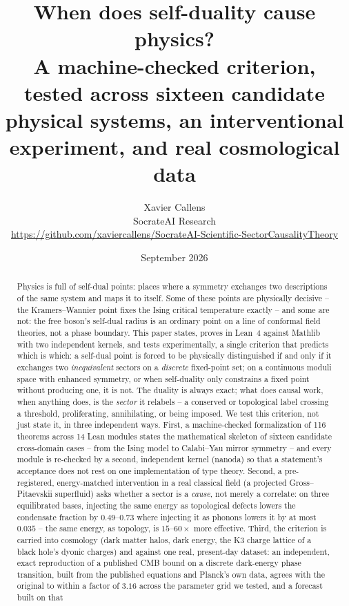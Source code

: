 \documentclass[11pt,a4paper]{article}
\title{\textbf{When does self-duality cause physics?}\\
\large A machine-checked criterion, tested across sixteen candidate physical systems, an interventional
experiment, and real cosmological data}
\author{Xavier Callens\\
\small SocrateAI Research\\
\small \url{https://github.com/xaviercallens/SocrateAI-Scientific-SectorCausalityTheory}}
\date{September 2026}
\begin{document}
\maketitle

\begin{abstract}
\noindent
Physics is full of self-dual points: places where a symmetry exchanges two descriptions of the same
system and maps it to itself. Some of these points are physically decisive -- the Kramers--Wannier
point fixes the Ising critical temperature exactly -- and some are not: the free boson's self-dual
radius is an ordinary point on a line of conformal field theories, not a phase boundary. This paper
states, proves in Lean~4 against Mathlib with two independent kernels, and tests experimentally, a
single criterion that predicts which is which: a self-dual point is forced to be physically
distinguished if and only if it exchanges two \emph{inequivalent} sectors on a \emph{discrete}
fixed-point set; on a continuous moduli space with enhanced symmetry, or when self-duality only
constrains a fixed point without producing one, it is not. The duality is always exact; what does
causal work, when anything does, is the \emph{sector} it relabels -- a conserved or topological label
crossing a threshold, proliferating, annihilating, or being imposed. We test this criterion, not just
state it, in three independent ways. First, a machine-checked formalization of 116 theorems across 14 Lean
modules states the mathematical skeleton of sixteen candidate cross-domain cases -- from the Ising
model to Calabi--Yau mirror symmetry -- and every module is re-checked by a second, independent kernel
(nanoda) so that a statement's acceptance does not rest on one implementation of type theory. Second,
a pre-registered, energy-matched intervention in a real classical field (a projected
Gross--Pitaevskii superfluid) asks whether a sector is a \emph{cause}, not merely a correlate: on three
equilibrated bases, injecting the same energy as topological defects lowers the condensate fraction
by $0.49$--$0.73$ where injecting it as phonons lowers it by at most $0.035$ -- the same energy, as
topology, is $15$--$60\times$ more effective. Third, the criterion is carried into cosmology (dark
matter halos, dark energy, the K3 charge lattice of a black hole's dyonic charges) and against one
real, present-day dataset: an independent, exact reproduction of a published CMB bound on a discrete
dark-energy phase transition, built from the published equations and Planck's own data, agrees with the
original to within a factor of $3.16$ across the parameter grid we tested, and a forecast built on that

\end{abstract}
\end{document}
